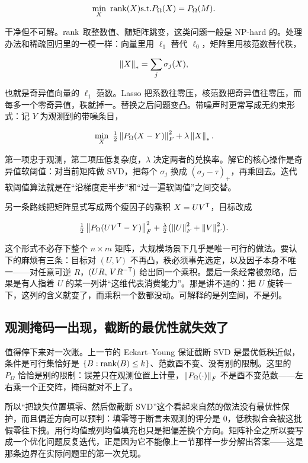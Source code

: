 \[
\min_X\ \operatorname{rank}(X)
\space\text{s.t.}\space
P_\Omega(X)=P_\Omega(M).
\]

干净但不可解。\(\operatorname{rank}\) 取整数值、随矩阵跳变，这类问题一般是 NP-hard 的。处理办法和稀疏回归里的一模一样：向量里用 \(\ell_1\) 替代 \(\ell_0\)，矩阵里用核范数替代秩，

\[
\left\lVert X\right\rVert_* = \sum_j\sigma_j(X),
\]

也就是奇异值向量的 \(\ell_1\) 范数。Lasso 把系数往零压，核范数把奇异值往零压，而每多一个零奇异值，秩就掉一。替换之后问题变凸。带噪声时更常写成无约束形式：记 \(Y\) 为观测到的带噪条目，

\[
\min_X\ \tfrac12\left\lVert P_\Omega(X-Y)\right\rVert_F^2 + \lambda\left\lVert X\right\rVert_* .
\]

第一项忠于观测，第二项压低复杂度，\(\lambda\) 决定两者的兑换率。解它的核心操作是奇异值软阈值：对当前矩阵做 SVD，把每个 \(\sigma_j\) 换成 \((\sigma_j-\tau)_+\)，再乘回去。迭代软阈值算法就是在``沿梯度走半步''和``过一遍软阈值''之间交替。

另一条路线把矩阵显式写成两个瘦因子的乘积 \(X=UV^{\mathsf{T}}\)，目标改成

\[
\tfrac12\left\lVert P_\Omega(UV^{\mathsf{T}}-Y)\right\rVert_F^2
+\tfrac{\lambda}{2}\bigl(\left\lVert U\right\rVert_F^2+\left\lVert V\right\rVert_F^2\bigr).
\]

这个形式不必存下整个 \(n\times m\) 矩阵，大规模场景下几乎是唯一可行的做法。要认下的麻烦有三条：目标对 \((U,V)\) 不再凸，秩必须事先选定，以及因子本身不唯一——对任意可逆 \(R\)，\((UR,\,VR^{-\mathsf{T}})\) 给出同一个乘积。最后一条经常被忽略，后果是有人指着 \(U\) 的某一列讲``这维代表消费能力''。那是讲不通的：把 \(U\) 旋转一下，这列的含义就变了，而乘积一个数都没动。可解释的是列空间，不是列。

\subsection{观测掩码一出现，截断的最优性就失效了}

值得停下来对一次账。上一节的 Eckart--Young 保证截断 SVD 是最优低秩近似，条件是可行集恰好是 \(\left\{B:\operatorname{rank}(B)\le k\right\}\)、范数酉不变、没有别的限制。这里的 \(P_\Omega\) 恰恰是别的限制：误差只在观测位置上计量，\(\left\lVert P_\Omega(\cdot)\right\rVert_F\) 不是酉不变范数——左右乘一个正交阵，掩码就对不上了。

所以``把缺失位置填零、然后做截断 SVD''这个看起来自然的做法没有最优性保护，而且偏差方向可以预判：填零等于断言未观测的评分是 0，低秩拟合会被这批假零往下拽。用行均值或列均值填充也只是把偏差换个方向。矩阵补全之所以要写成一个优化问题反复迭代，正是因为它不能像上一节那样一步分解出答案——这是那条边界在实际问题里的第一次兑现。

